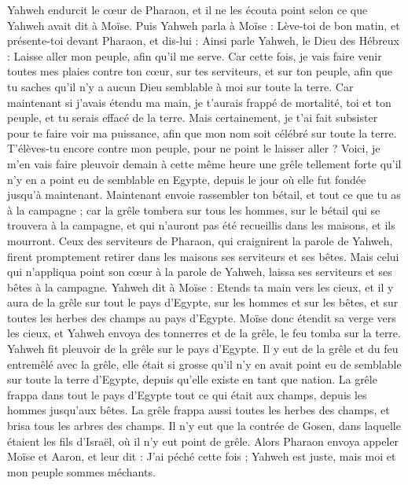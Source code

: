 \begin{multicols}{2}
Yahweh endurcit le cœur de Pharaon, et il ne les écouta point selon ce que Yahweh avait dit à Moïse.
Puis Yahweh parla à Moïse : Lève-toi de bon matin, et présente-toi devant Pharaon, et dis-lui : Ainsi parle Yahweh, le Dieu des Hébreux : Laisse aller mon peuple, afin qu'il me serve.
Car cette fois, je vais faire venir toutes mes plaies contre ton cœur, sur tes serviteurs, et sur ton peuple, afin que tu saches qu'il n'y a aucun Dieu semblable à moi sur toute la terre.
Car maintenant si j'avais étendu ma main, je t'aurais frappé de mortalité, toi et ton peuple, et tu serais effacé de la terre.
Mais certainement, je t'ai fait subsister pour te faire voir ma puissance, afin que mon nom soit célébré sur toute la terre.
T'élèves-tu encore contre mon peuple, pour ne point le laisser aller ?
Voici, je m'en vais faire pleuvoir demain à cette même heure une grêle tellement forte qu’il n'y en a point eu de semblable en Egypte, depuis le jour où elle fut fondée jusqu’à maintenant.
Maintenant envoie rassembler ton bétail, et tout ce que tu as à la campagne ; car la grêle tombera sur tous les hommes, sur le bétail qui se trouvera à la campagne, et qui n’auront pas été recueillis dans les maisons, et ils mourront.
Ceux des serviteurs de Pharaon, qui craignirent la parole de Yahweh, firent promptement retirer dans les maisons ses serviteurs et ses bêtes.
Mais celui qui n'appliqua point son cœur à la parole de Yahweh, laissa ses serviteurs et ses bêtes à la campagne.
Yahweh dit à Moïse : Etends ta main vers les cieux, et il y aura de la grêle sur tout le pays d'Egypte, sur les hommes et sur les bêtes, et sur toutes les herbes des champs au pays d'Egypte.
Moïse donc étendit sa verge vers les cieux, et Yahweh envoya des tonnerres et de la grêle, le feu tomba sur la terre. Yahweh fit pleuvoir de la grêle sur le pays d'Egypte.
Il y eut de la grêle et du feu entremêlé avec la grêle, elle était si grosse qu'il n'y en avait point eu de semblable sur toute la terre d'Egypte, depuis qu'elle existe en tant que nation.
La grêle frappa dans tout le pays d'Egypte tout ce qui était aux champs, depuis les hommes jusqu'aux bêtes. La grêle frappa aussi toutes les herbes des champs, et brisa tous les arbres des champs.
Il n'y eut que la contrée de Gosen, dans laquelle étaient les fils d'Israël, où il n'y eut point de grêle.
Alors Pharaon envoya appeler Moïse et Aaron, et leur dit : J'ai péché cette fois ; Yahweh est juste, mais moi et mon peuple sommes méchants.

\end{multicols}
